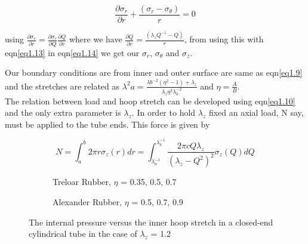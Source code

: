 \documentclass[12pt]{report}
\begin{document}
\begin{flushleft}
\begin{equation}\label{eq1.14}
    \frac{\partial\sigma_{r}}{\partial r} +\frac{(\sigma_{r}-\sigma_{\theta})}{r} = 0
\end{equation}

using $\frac{\partial\sigma_{r}}{\partial r}=\frac{\partial\sigma_{r}}{\partial Q}\frac{\partial Q}{\partial r}$ where we have $\frac{\partial Q}{\partial r} =\frac{(\lambda_{z}Q^{-1}-Q)}{r}$, from using this with eqn\ref{eq1.13} in eqn\ref{eq1.14} we get our $\sigma_{r}$, $\sigma_{\theta}$ and $\sigma_{z}$.

Our boundary conditions are from inner and outer surface are same as eqn\ref{eq1.9} and the stretches are related as $\lambda^{2}{a} = \frac{\lambda{b}^{-2}(\eta^{2}-1)+\lambda_{z}}{\lambda_{z}\eta^{2}\lambda_{b}^{-2}}$ and $\eta = \frac{A}{B}$.\\

The relation between load and hoop stretch can be developed using eqn\ref{eq1.10} and the only extra parameter is $\lambda_{z}$. In order to hold $\lambda_{z}$ fixed an axial load, N say, must be applied to the tube ends. This force is given by

\begin{equation}\label{eq1.15}
    N = \int_{a}^{b}2\pi r\sigma_{z}(r)dr = \int_{\lambda_{a}^{-1}}^{\lambda_{b}^{-1}}\frac{2\pi c Q\lambda_{z}}{(\lambda_{z}-Q^{2})^{2}}\sigma_{z}(Q)dQ
\end{equation}

\end{flushleft} 

\begin{figure}[!h]
	\centering
	\begin{subfigure}{0.45\textwidth}
			\centering
			\caption{Treloar Rubber, $\eta$ = 0.35, 0.5, 0.7}
		\end{subfigure}
		\begin{subfigure}{0.45\textwidth}
			\centering
			\caption{Alexander Rubber, $\eta$ = 0.5, 0.7, 0.9}
		\end{subfigure}
	\caption{The internal pressure versus the inner hoop stretch in a closed-end cylindrical tube in the case of $\lambda_{z}$ = 1.2}
	\centering
	\label{Fig1.5}
\end{figure}
\end{document}
